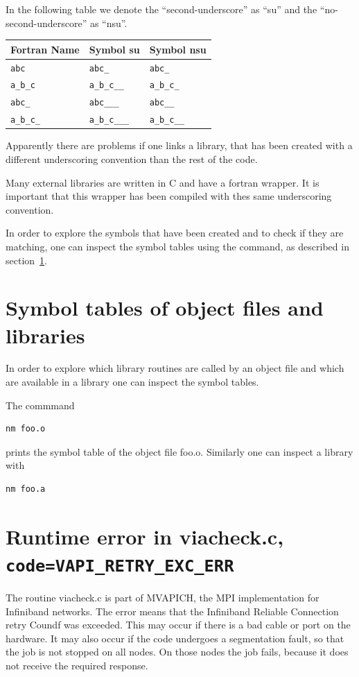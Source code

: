 \documentclass[a4paper,10pt]{report}
\newcommand{\mytt}[1]{{\tt #1}}
\begin{document}
In the following table we denote the ``second-underscore'' as ``su''
and the ``no-second-underscore'' as ``nsu''.
\begin{center}
\begin{tabular}{|l|l|l|}
\hline
Fortran Name & Symbol su & Symbol nsu\\
\hline
\verb+abc+ & \verb+abc_+ &\verb+abc_+\\
\verb+a_b_c+ & \verb+a_b_c__+& \verb+a_b_c_+\\
\verb+abc_+ & \verb+abc___+& \verb+abc__+ \\
\verb+a_b_c_+ & \verb+a_b_c___+& \verb+a_b_c__+\\
\hline
\end{tabular}
\end{center}

Apparently there are problems if one links a library, that has been
created with a different underscoring convention than the rest of the
code.

Many external libraries are written in C and have a fortran wrapper.
It is important that this wrapper has been compiled with thes same
underscoring convention.

In order to explore the symbols that have been created and to check if
they are matching, one can inspect the symbol tables using the
command, as described in section~\ref{sec:nm}.

\section{Symbol tables of object files and libraries}
\label{sec:nm}
In order to explore which library routines are called by an object
file and which are available in a library one can inspect the symbol
tables.

The commmand
\begin{verbatim}
nm foo.o
\end{verbatim}
 prints the symbol table of the object file foo.o.
Similarly one can inspect a library with 
\begin{verbatim}
nm foo.a
\end{verbatim}




\section{Runtime error in viacheck.c, \mytt{code=VAPI\_RETRY\_EXC\_ERR}}
The routine viacheck.c is part of MVAPICH, the MPI implementation for
Infiniband networks. The error means that the Infiniband Reliable
Connection retry Coundf was exceeded. This may occur if there is a bad
cable or port on the hardware. It may also occur if the code undergoes
a segmentation fault, so that the job is not stopped on all nodes. On
those nodes the job fails, because it does not receive the required
response.
\end{document}
